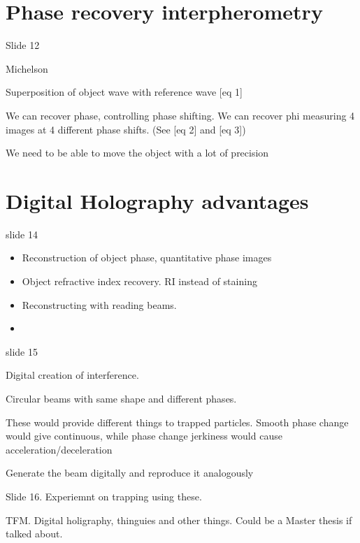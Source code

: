 \documentclass[../main/main.tex]{subfiles}
\begin{document}
\section{Phase recovery interpherometry }
Slide 12

Michelson

Superposition of object wave with reference wave [eq 1]

We can recover phase, controlling phase shifting.
We can recover phi measuring 4 images at 4 different phase shifts. (See [eq 2] and [eq 3])

We need to be able to move the object with a lot of precision

\section{Digital Holography advantages}

slide 14

\begin{itemize}
	\item Reconstruction of object phase, quantitative phase images
	\item Object refractive index recovery. RI instead of staining
	\item Reconstructing with reading beams.
	\item
\end{itemize}


slide 15

Digital creation of interference.

Circular beams with same shape and different phases.

These would provide different things to trapped particles.
Smooth phase change would give continuous, while phase change jerkiness would cause acceleration/deceleration

Generate the beam digitally and reproduce it analogously

Slide 16. Experiemnt on trapping using these.


TFM. Digital holigraphy, thinguies and other things. Could be a Master thesis if talked about.
\end{document}
